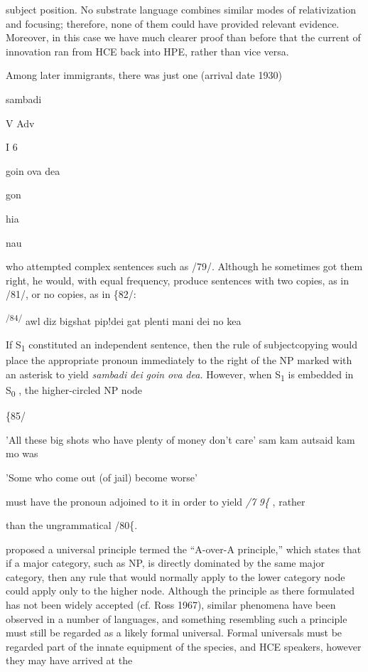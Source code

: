subject position. No substrate language combines similar modes of relativization and focusing; therefore, none of them could have pro\-vided relevant evidence. Moreover, in this case we have much clearer proof than before that the current of innovation ran from HCE back into HPE, rather than vice versa.

Among later immigrants, there was just one (arrival date 1930)

sambadi

V Adv

I 6

goin ova dea

gon

hia

nau

who attempted complex sentences such as /79/. Although he some\-times got them right, he would, with equal frequency, produce sen\-tences with two copies, as in /81/, or no copies, as in \{82/:

\textsuperscript{/84/ }awl diz bigshat pip!dei gat plenti mani dei no kea

If S\textsubscript{1}\textsubscript{ }constituted an independent sentence, then the rule of subject\-copying would place the appropriate pronoun immediately to the right of the NP marked with an asterisk to yield \textit{sambadi} \textit{dei} \textit{goin} \textit{ova} \textit{dea.} However, when S\textsubscript{1}\textsubscript{ }is embedded in S\textsubscript{0}\textsubscript{ }, the higher-circled NP node

\{85/

'All these big shots who have plenty of money don't care' sam kam autsaid kam mo was

'Some who come out (of jail) become worse'

must have the pronoun adjoined to it in order to yield \textit{/7} \textit{9\{} , rather

than the ungrammatical /80\{.

\citet{Chomsky1964} proposed a universal principle termed the ``A-over-A principle,'' which states that if a major category, such as NP, is directly dominated by the same major category, then any rule that would normally apply to the lower category node could apply only to the higher node. Although the principle as there formulated has not been widely accepted (cf. Ross 1967), similar phenomena have been observed in a number of languages, and something resembling such a principle must still be regarded as a likely formal universal. Formal universals must be regarded part of the innate equipment of the species, and HCE speakers, however they may have arrived at the

